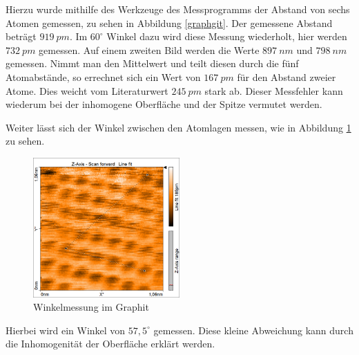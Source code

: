 Hierzu wurde mithilfe des Werkzeuge des Messprogramms der Abstand von sechs
Atomen gemessen, zu sehen in Abbildung \ref{graphgit}. Der gemessene Abstand
beträgt $\SI{919}{pm}$. Im $60^\circ$ Winkel dazu wird diese Messung wiederholt,
hier werden $\SI{732}{pm}$ gemessen. Auf einem zweiten Bild werden die Werte
$\SI{897}{nm}$ und $\SI{798}{nm}$ gemessen. Nimmt man den Mittelwert und teilt
diesen durch die fünf Atomabstände, so errechnet sich ein Wert von $\SI{167}{pm}$
für den Abstand zweier Atome.
Dies weicht vom Literaturwert $\SI{245}{pm}$ stark ab. Dieser Messfehler kann 
wiederum bei der inhomogene Oberfläche und der Spitze vermutet werden.\par
Weiter lässt sich der Winkel zwischen den Atomlagen messen, wie in Abbildung
\ref{graphwinkel} zu sehen. 
\begin{figure}[h]
    \centering
    \includegraphics[width=0.5\textwidth]{Mess/graphit_winkel.png}
    \caption{Winkelmessung im Graphit}
    \label{graphwinkel}
\end{figure}
Hierbei wird ein Winkel von $57,5^\circ$ gemessen. Diese kleine Abweichung
kann durch die Inhomogenität der Oberfläche erklärt werden.

